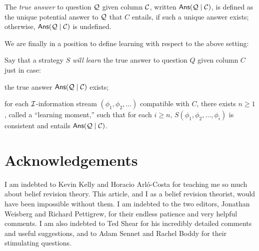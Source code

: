 	\im The {\em true answer} to question $\cal Q$ given column $\cal C$, written $\mathsf{Ans}({\cal Q} \mid {\cal C})$, is defined as the unique potential answer to $\cal Q$ that $C$ entails, if such a unique answer exists; otherwise, $\mathsf{Ans}({\cal Q} \mid {\cal C})$ is undefined. 
	
\ed We are finally in a position to define learning with respect to the above setting: \op

	\im Say that a strategy $S$ {\em will learn} the true answer to question $Q$ given column $C$ just in case: \op
	
		\im[(1)] the true answer $\mathsf{Ans}({\cal Q} \mid {\cal C})$ exists;
		
		\im[(2)] for each $\cal I$-information stream $(\phi_1, \phi_2, \ldots)$ compatible with $C$, there exists $n \ge 1$, called a ``learning moment,'' such that for each $i\ge n$, $S(\phi_1, \phi_2, \ldots, \phi_i)$ is consistent and entails $\mathsf{Ans}({\cal Q} \mid {\cal C})$.
	\ed
\ed   



\section*{Acknowledgements}

I am indebted to Kevin Kelly and Horacio Arl\'{o}-Costa for teaching me so much about belief revision theory. This article, and I as a belief revision theorist, would have been impossible without them. I am indebted to the two editors, Jonathan Weisberg and Richard Pettigrew, for their endless patience and very helpful comments. I am also indebted to Ted Shear for his incredibly detailed comments and useful suggestions, and to Adam Sennet and Rachel Boddy for their stimulating questions.